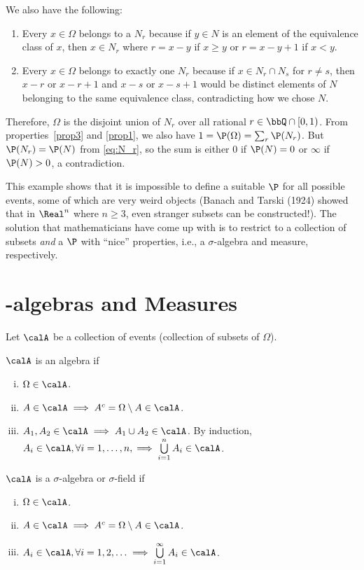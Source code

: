 \documentclass[../aipt.tex]{subfiles}
\begin{document}
\begin{Example}
We also have the following:
\begin{enumerate}
	\item Every $x\in\Omega$ belongs to a $N_r$ because if $y\in N$ is an element of the equivalence class of $x$, then $x \in N_r$ where $r = x-y$ if $x\geq y$ or $r=x-y+1$ if $x<y$. 
	\item Every $x\in\Omega$ belongs to exactly one $N_r$ because if $x\in N_r\cap N_s$ for $r\ne s$, then $x-r$ or $x-r+1$ and $x-s$ or $x-s+1$ would be distinct elements of $N$ belonging to the same equivalence class, contradicting how we chose $N$. 
\end{enumerate}
Therefore, $\Omega$ is the disjoint union of $N_r$ over all rational $r\in \bbQ\cap [0,1)$. From properties~\ref{prop3} and \ref{prop1}, we also have $1 = \P(\Omega) = \sum_r \P(N_r)$. But $\P(N_r)=\P(N)$ from \cref{eq:N_r}, so the sum is either $0$ if $\P(N)=0$ or $\infty$ if $\P(N)>0$, a contradiction. 

This example shows that it is impossible to define a suitable $\P$ for all possible events, some of which are very weird objects (Banach and Tarski (1924) showed that in $\Real^n$ where $n\geq3$, even stranger subsets can be constructed!). The solution that mathematicians have come up with is to restrict to a collection of subsets \emph{and} a $\P$ with ``nice'' properties, i.e., a $\sigma$-algebra and measure, respectively. 
\end{Example}

\section{-algebras and Measures}
Let $\calA$ be a collection of events (collection of subsets of $\Omega$). 

\begin{Definition}
$\calA$ is an algebra if
\begin{enumerate}[(i)]
\item $\Omega \in \calA$.
\item $A \in \calA \implies A^c = \Omega \setminus A \in \calA$.
\item $A_1, A_2 \in \calA \implies A_1 \cup A_2 \in \calA$. By induction, $A_i \in \calA, \forall i = 1, \ldots, n, \implies \bigcup\limits_{i=1}^{n} A_i \in \calA$.
\end{enumerate}
\end{Definition}

\begin{Definition}
$\calA$ is a $\sigma$-algebra or $\sigma$-field if
\begin{enumerate}[(i)]
\item $\Omega \in \calA$.
\item $A \in \calA \implies A^c = \Omega \setminus A \in \calA$.
\item $A_i \in \calA, \forall i = 1, 2, \ldots \implies \bigcup\limits_{i=1}^{\infty} A_i \in \calA$.
\end{enumerate}
\end{Definition}
\end{document}
